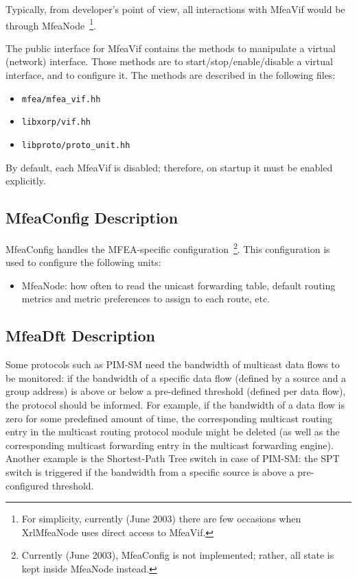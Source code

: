 \documentclass[11pt]{article}
\begin{document}
Typically, from developer's point of view, all interactions with MfeaVif
would be through MfeaNode~\footnote{For simplicity, currently (June
2003) there are few occasions when XrlMfeaNode uses direct access to MfeaVif.}.

The public interface for MfeaVif contains the methods to manipulate a
virtual (network) interface. Those methods are to start/stop/enable/disable a
virtual interface, and to configure it. The methods are described in
the following files:

\begin{itemize}
  \item \verb=mfea/mfea_vif.hh=
  \item \verb=libxorp/vif.hh=
  \item \verb=libproto/proto_unit.hh=
\end{itemize}

By default, each MfeaVif is disabled; therefore, on startup it must be
enabled explicitly.


\subsection{MfeaConfig Description}

MfeaConfig handles the MFEA-specific configuration~\footnote{Currently
(June 2003), MfeaConfig is not implemented; rather, all state is
kept inside MfeaNode instead.}. This configuration is used to configure the
following units:

\begin{itemize}

  \item MfeaNode: how often to read the unicast forwarding table,
  default routing metrics and metric preferences to assign to each
  route, etc.

\end{itemize}


\subsection{MfeaDft Description}

Some protocols such as PIM-SM need the bandwidth of multicast data flows
to be monitored: if the bandwidth of a specific data flow (defined by
a source and a group address) is above or below a pre-defined threshold
(defined per data flow), the protocol should be informed. For example, if the
bandwidth of a data flow is zero for some predefined amount of time, the
corresponding multicast routing entry in the multicast routing protocol
module might be deleted (as well as the corresponding multicast
forwarding entry in the multicast forwarding engine). Another example is
the Shortest-Path Tree switch in case of PIM-SM: the SPT switch is
triggered if the bandwidth from a specific source is above a
pre-configured threshold.
\end{document}
